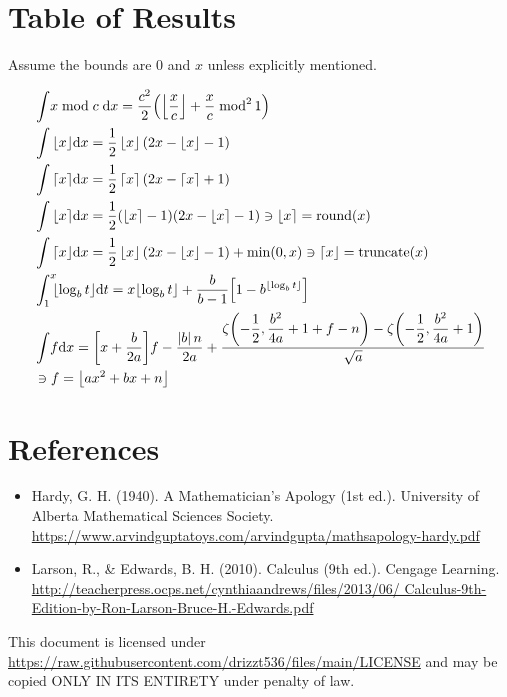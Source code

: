 \documentclass[12pt]{article}
\newcommand{\floor}[1]{\left\lfloor #1 \right\rfloor}
\newcommand{\ceil}[1]{ \left\lceil  #1 \right\rceil}
\newcommand{\round}[1]{\left\lfloor #1 \right\rceil}
\newcommand{\trunc}[1]{\left\lceil  #1 \right\rfloor}
\newcommand{\pgrp}[1]{\left( #1 \right)}   %
\newcommand{\bgrp}[1]{\left[ #1 \right]}   %
\newcommand{\abs}[1]{\left| #1 \right|}
\newcommand{\dx}{\df x}
\newcommand{\dt}{\df t}
\newcommand{\df}[1]{\mathrm{d} #1}
\begin{document}
{}
\section*{Table of Results}

	\indent\indent Assume the bounds are $0$ and $x$ unless explicitly mentioned.

	\begin{minipage}{\textwidth}
		\centering
		\begin{align}
			& \int \! x \bmod c\; \dx = \dfrac{c^2}2\!\pgrp{\floor{\dfrac xc}+
										\dfrac xc\;\mathrm{mod}^2\,1}\\
			& \int \floor x\!\dx = \dfrac12\floor x(2x-\floor x-1)\\
			& \int \ceil  x\!\dx = \dfrac12\ceil x(2x-\ceil x+1)\\
			& \int \round x\!\dx = \dfrac12(\round x-1)(2x-\round x-1)\ni\round x=
								\mathrm{round}(x)\\
			& \int \trunc x\!\dx = \dfrac12\floor x(2x - \floor x - 1) + \min(0,x) \ni\trunc x =
								\mathrm{truncate}(x)\\
			& \int_1^x \!\!\!\floor{\log_b t}\!\dt = x \!\floor{\log_b t} + \dfrac b{b-1}\!
												\bgrp{1 - b^{\floor{\log_b t}}} \\
			& \int \!f \dx = \bgrp{x+\dfrac b{2a}}\!f-\dfrac{\abs bn}{2a}+\dfrac{\zeta\!\pgrp{-
							\dfrac12,\dfrac{b^2}{4a}+1+f-n}-\zeta\!\pgrp{-\dfrac12,\dfrac{b^2}{4a}
							+1}}{\sqrt a}\\
			& \ni f = \floor{ax^2 + bx + n} \notag
		\end{align}
	\end{minipage}

{}
\section*{References}

	\begin{itemize}
		\item Hardy, G. H. (1940). A Mathematician's Apology (1st ed.). University of Alberta
			Mathematical Sciences Society.\\
			\url{https://www.arvindguptatoys.com/arvindgupta/mathsapology-hardy.pdf}\\

		\item Larson, R., \& Edwards, B. H. (2010). Calculus (9th ed.). Cengage Learning.\\
			\url{http://teacherpress.ocps.net/cynthiaandrews/files/2013/06/
			Calculus-9th-Edition-by-Ron-Larson-Bruce-H.-Edwards.pdf}
	\end{itemize}
	\vfill
	This document is licensed under
	\url{https://raw.githubusercontent.com/drizzt536/files/main/LICENSE}
	and may be copied ONLY IN ITS ENTIRETY under penalty of law.
	\vspace{0.5em}
\end{document}
